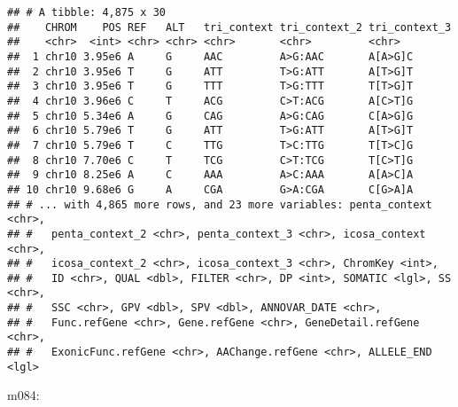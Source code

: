 \documentclass[]{article}
\begin{document}
\begin{verbatim}
## # A tibble: 4,875 x 30
##    CHROM    POS REF   ALT   tri_context tri_context_2 tri_context_3
##    <chr>  <int> <chr> <chr> <chr>       <chr>         <chr>        
##  1 chr10 3.95e6 A     G     AAC         A>G:AAC       A[A>G]C      
##  2 chr10 3.95e6 T     G     ATT         T>G:ATT       A[T>G]T      
##  3 chr10 3.95e6 T     G     TTT         T>G:TTT       T[T>G]T      
##  4 chr10 3.96e6 C     T     ACG         C>T:ACG       A[C>T]G      
##  5 chr10 5.34e6 A     G     CAG         A>G:CAG       C[A>G]G      
##  6 chr10 5.79e6 T     G     ATT         T>G:ATT       A[T>G]T      
##  7 chr10 5.79e6 T     C     TTG         T>C:TTG       T[T>C]G      
##  8 chr10 7.70e6 C     T     TCG         C>T:TCG       T[C>T]G      
##  9 chr10 8.25e6 A     C     AAA         A>C:AAA       A[A>C]A      
## 10 chr10 9.68e6 G     A     CGA         G>A:CGA       C[G>A]A      
## # ... with 4,865 more rows, and 23 more variables: penta_context <chr>,
## #   penta_context_2 <chr>, penta_context_3 <chr>, icosa_context <chr>,
## #   icosa_context_2 <chr>, icosa_context_3 <chr>, ChromKey <int>,
## #   ID <chr>, QUAL <dbl>, FILTER <chr>, DP <int>, SOMATIC <lgl>, SS <chr>,
## #   SSC <chr>, GPV <dbl>, SPV <dbl>, ANNOVAR_DATE <chr>,
## #   Func.refGene <chr>, Gene.refGene <chr>, GeneDetail.refGene <chr>,
## #   ExonicFunc.refGene <chr>, AAChange.refGene <chr>, ALLELE_END <lgl>
\end{verbatim}

m084:
\end{document}
